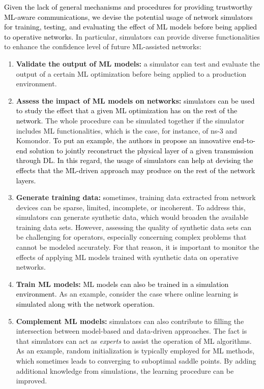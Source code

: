 \documentclass[journal]{IEEEtran}
\begin{document}
	\textcolor{black}{Given the lack of general mechanisms and procedures for providing trustworthy ML-aware communications, we devise the potential usage of network simulators for training, testing, and evaluating the effect of ML models before being applied to operative networks.} In particular, simulators can provide diverse functionalities to enhance the confidence level of future ML-assisted networks: 
	\begin{enumerate}
		\item \textbf{Validate the output of ML models:} a simulator can test and evaluate the output of a certain ML optimization before being applied to a production environment. 
		\item \textbf{Assess the impact of ML models on networks:} \textcolor{black}{simulators can be used to study the effect that a given ML optimization has on the rest of the network.} The whole procedure can be simulated together if the simulator includes ML functionalities, which is the case, for instance, of ns-3 and Komondor. \textcolor{black}{To put an example, the authors in \cite{survey6} propose an innovative end-to-end solution to jointly reconstruct the physical layer of a given transmission through DL. In this regard, the usage of simulators can help at devising the effects that the ML-driven approach may produce on the rest of the network layers.}	
		\item \textbf{Generate training data:} sometimes, training data extracted from network devices can be sparse, limited, incomplete, or incoherent. To address this, simulators can generate synthetic data, which would broaden the available training data sets. However, assessing the quality of synthetic data sets can be challenging for operators, especially concerning complex problems that cannot be modeled accurately. For that reason, it is important to monitor the effects of applying ML models trained with synthetic data on operative networks.
		\item \textbf{Train ML models:} \textcolor{black}{ML models can also be trained in a simulation environment.} As an example, consider the case where online learning \textcolor{black}{is simulated along with the network operation}. 
		\item \textbf{Complement ML models:} simulators can also contribute to filling the intersection between model-based and data-driven approaches. The fact is that simulators can act as \textit{experts} to assist the operation of ML algorithms. As an example, random initialization is typically employed for ML methods, which sometimes leads to converging to suboptimal saddle points. By adding additional knowledge from simulations, the learning procedure can be improved.
	\end{enumerate}
			
\end{document}
